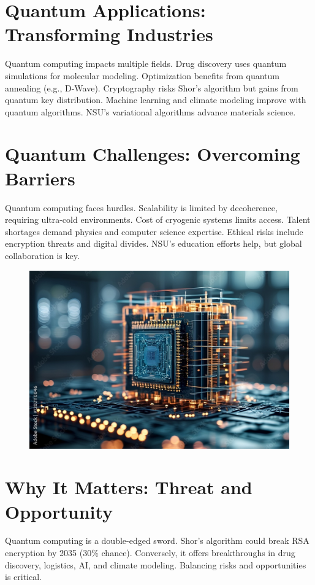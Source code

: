 \documentclass[a4paper,10pt,twocolumn]{memoir}
\begin{document}
\section*{Quantum Applications: Transforming Industries}
Quantum computing impacts multiple fields. Drug discovery uses quantum simulations for molecular modeling. Optimization benefits from quantum annealing (e.g., D-Wave). Cryptography risks Shor's algorithm but gains from quantum key distribution. Machine learning and climate modeling improve with quantum algorithms. NSU's variational algorithms advance materials science.


\section*{Quantum Challenges: Overcoming Barriers}
Quantum computing faces hurdles. Scalability is limited by decoherence, requiring ultra-cold environments. Cost of cryogenic systems limits access. Talent shortages demand physics and computer science expertise. Ethical risks include encryption threats and digital divides. NSU's education efforts help, but global collaboration is key.


\begin{figure}[ht]
  \centering
  \includegraphics[width=\columnwidth]{QC-4.jpeg}
  \caption{}
  \label{fig4}
\end{figure}


\section*{Why It Matters: Threat and Opportunity}
Quantum computing is a double-edged sword. Shor's algorithm could break RSA encryption by 2035 (30\% chance). Conversely, it offers breakthroughs in drug discovery, logistics, AI, and climate modeling. Balancing risks and opportunities is critical.
\end{document}
